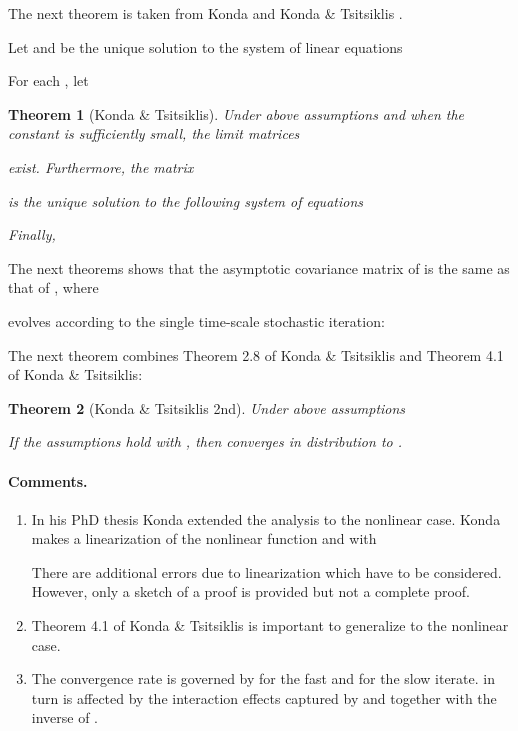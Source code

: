 \documentclass{article}
\newtheorem{theorem}{Theorem}
\begin{document}
The next theorem is taken from  Konda
\cite{Konda:02} and Konda \& Tsitsiklis \cite{Konda:04}.

Let  and  be the unique
solution to the system of linear equations

For each , let



\begin{theorem}[Konda \& Tsitsiklis]
\label{th:kondaRate}
Under above assumptions and when the constant  is
sufficiently small, the limit matrices

exist. Furthermore, the matrix

is the unique solution to the following system of equations

Finally,


\end{theorem}

The next theorems shows that the asymptotic covariance matrix of
 is the same as
that of , where

evolves according to the single time-scale stochastic
iteration:




The next theorem combines Theorem 2.8 of Konda \& Tsitsiklis
and Theorem 4.1 of Konda \& Tsitsiklis:
\begin{theorem}[Konda \& Tsitsiklis 2nd]
\label{th:kondaRate2}
Under above assumptions


If the assumptions hold with , then
 converges in distribution to
.
\end{theorem}


\paragraph{Comments.}
\begin{enumerate}[label=\textbf{(C\arabic*)}]
\item
In his PhD thesis \cite{Konda:02} Konda extended the analysis to the
nonlinear case.
Konda makes a linearization of the nonlinear function  and  with

There are additional errors due to linearization which have to be
considered.
However, only a sketch of a proof is provided but not a complete proof.

\item
Theorem 4.1 of Konda \& Tsitsiklis is important to generalize to the
nonlinear case.

\item
The convergence rate is governed by
 for the fast and 
for the slow iterate.
 in turn is affected by the interaction effects
captured by  and  together with the inverse of
.

\end{enumerate}
\end{document}
